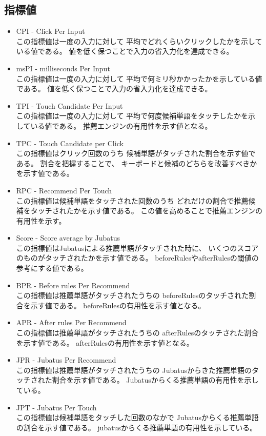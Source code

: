 \subsection{指標値}
\begin{itemize}
  \item CPI - Click Per Input\mbox{}\\
    この指標値は一度の入力に対して
    平均でどれくらいクリックしたかを示している値である。
    値を低く保つことで入力の省入力化を達成できる。
  \item msPI - milliseconds Per Input\mbox{}\\
    この指標値は一度の入力に対して
    平均で何ミリ秒かかったかを示している値である。
    値を低く保つことで入力の省入力化を達成できる。
  \item TPI - Touch Candidate Per Input\mbox{}\\
    この指標値は一度の入力に対して
    平均で何度候補単語をタッチしたかを示している値である。
    推薦エンジンの有用性を示す値となる。
  \item TPC - Touch Candidate per Click\mbox{}\\
    この指標値はクリック回数のうち
    候補単語がタッチされた割合を示す値である。
    割合を把握することで、
    キーボードと候補のどちらを改善すべきかを示す値である。
  \item RPC - Recommend Per Touch\mbox{}\\
    この指標値は候補単語をタッチされた回数のうち
    どれだけの割合で推薦候補をタッチされたかを示す値である。
    この値を高めることで推薦エンジンの有用性を示す。
  \item Score - Score average by Jubatus\mbox{}\\
    この指標値はJubatusによる推薦単語がタッチされた時に、
    いくつのスコアのものがタッチされたかを示す値である。
    beforeRulesやafterRulesの閾値の参考にする値である。
  \item BPR - Before rules Per Recommend\mbox{}\\
    この指標値は推薦単語がタッチされたうちの
    beforeRulesのタッチされた割合を示す値である。
    beforeRulesの有用性を示す値となる。
  \item APR - After rules Per Recommend\mbox{}\\
    この指標値は推薦単語がタッチされたうちの
    afterRulesのタッチされた割合を示す値である。
    afterRulesの有用性を示す値となる。
  \item JPR - Jubatus Per Recommend\mbox{}\\
    この指標値は推薦単語がタッチされたうちの
    Jubatusからきた推薦単語のタッチされた割合を示す値である。
    Jubatusからくる推薦単語の有用性を示している。
  \item JPT - Jubatus Per Touch\mbox{}\\
    この指標値は候補単語をタッチした回数のなかで
    Jubatusからくる推薦単語の割合を示す値である。
    jubatusからくる推薦単語の有用性を示している。
\end{itemize}
